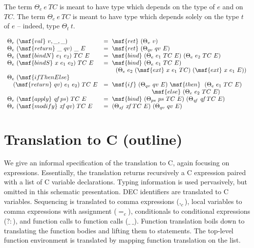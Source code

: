 \documentclass{article}
\begin{document}
The term $\Theta_e \ e \ TC$ is meant to have type which depends on the
type of $e$ and on $TC$. The term $\Theta_e \ e \ TC$ is meant to have
type which depends solely on the type $t$ of $e$ -- indeed, type
$\Theta_t \ t$.


\begin{gather}
\begin{array}{lll}  
\Theta_e \ (\msf{val} \ v, \_, \_) & = \ \msf{ret} \ (\Theta_v \ v) \\
%
\Theta_e \ (\msf{return} \ \_ \ qv) \ \_ \ E & = \ \msf{ret}
\ (\Theta_{qv} \ qv \ E) \\
%
\Theta_e \ (\msf{bindN} \ e_1 \ e_2) \ TC \ E & = \ \msf{bind}
\ (\Theta_e \ e_1 \ TC \ E) \ (\Theta_e \ e_2 \ TC \ E) \\
%
\Theta_e \ (\msf{bindS} \ x \ e_1 \ e_2) \ TC \ E & = \ \msf{bind}
\ (\Theta_e \ e_1 \ TC \ E) \\ & \qquad (\Theta_e \ e_2 \ (\msf{ext} \ x
\ e_1 \ TC) \ (\msf{ext} \ x \ e_1 \ E)) \\
%
\Theta_e \ (\msf{ifThenElse} \\ \quad (\msf{return} \ qv) \ e_1 \ e_2)
\ TC \ E & = \ \msf{if} \ (\Theta_{qv} \ qv \ E) \ \msf{then}
\ \ (\Theta_e \ e_1 \ TC \ E) \\ & \qquad \qquad \qquad \qquad
\msf{else} \ (\Theta_e \ e_2 \ TC \ E) \\
%
\Theta_e \ (\msf{apply} \ \mbox{\it qf} \ ps) \ TC \ E & =
\ \msf{bind} \ (\Theta_{ps} \ ps \ TC \ E) \ (\Theta_{\it{qf}}
\ \mbox{\it qf} \ TC \ E) \\
%
\Theta_e \ (\msf{modify} \ \mbox{\it xf} \ qv) \ TC \ E & = 
\ (\Theta_{\it{xf}} \ \mbox{\it xf} \ TC \ E) \ (\Theta_{qv} \ qv \ E)
\end{array}
\end{gather}


\section{Translation to C (outline)}


We give an informal specification of the translation to C, again
focusing on expressions. Essentially, the translation returns
recursively a C expression paired with a list of C variable
declarations. Typing information is used pervasively, but omitted in
this schematic presentation. DEC identifiers are translated to C
variables. Sequencing is translated to comma expressions ($,_c$),
local variables to comma expressions with assignment ($=_c$),
conditionals to conditional expressions ($?:$), and function calls to
function calls ($\_ \ \_$). Function translation boils down to
translating the function bodies and lifting them to statements. The
top-level function environment is translated by mapping function
translation on the list.
\end{document}
